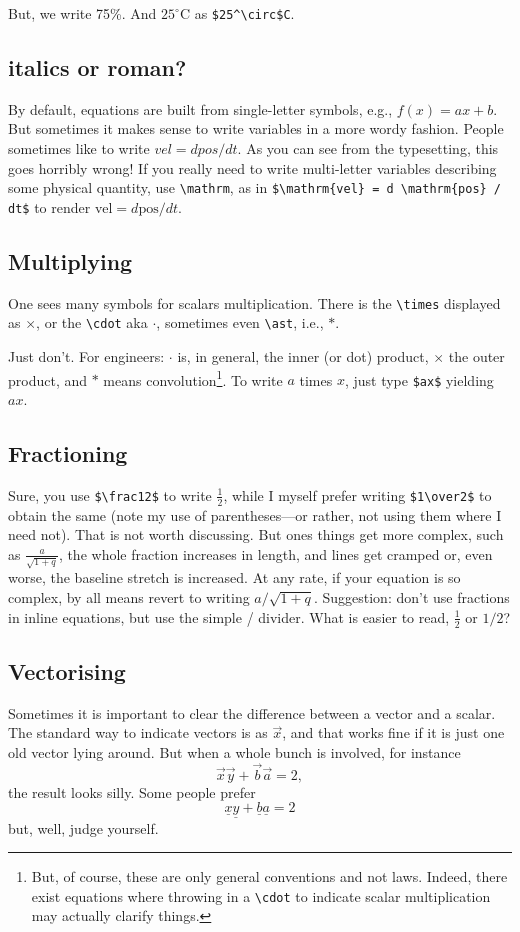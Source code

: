 \documentclass{article}
\begin{document}
But, we write 75\%. And $25^\circ$C as \verb+$25^\circ$C+.


\subsection{italics or roman?}
By default, equations are built from single-letter symbols, e.g., $f(x) = ax+b$.  But sometimes it makes
sense to write variables in a more wordy fashion.  People sometimes like to write $vel = d pos / d t$.  As
you can see from the typesetting, this goes horribly wrong!  If you really need to write multi-letter
variables describing some physical quantity, use \verb+\mathrm+, as in
\verb+$\mathrm{vel} = d \mathrm{pos} / dt$+ to render $\mathrm{vel} = d \mathrm{pos} / dt$.

\subsection{Multiplying}
One sees many symbols for scalars multiplication.  There is the \verb+\times+ displayed as $\times$,
or the \verb+\cdot+ aka $\cdot$, sometimes even \verb+\ast+, i.e., $\ast$.

Just don't.  For engineers: $\cdot$ is, in general, the inner (or dot) product, $\times$ the 
outer product, and $\ast$ means convolution\footnote{But, of course, these are only
general conventions and not laws.  Indeed, there exist equations where throwing in
a \verb+\cdot+ to indicate scalar multiplication may actually clarify things.}. To write
$a$ times $x$, just type \verb+$ax$+ yielding $ax$.


\subsection{Fractioning}
Sure, you use \verb+$\frac12$+ to write $\frac12$, while I myself prefer writing \verb+$1\over2$+ to obtain
the same (note my use of parentheses---or rather, not using them where I need not).
That is not worth discussing.  But ones things get more complex, such as $\frac a{\sqrt{1+q}}$, the whole
fraction increases in length, and lines get cramped or, even worse, the baseline stretch is increased.
At any rate, if your equation is so complex, by all means revert to writing $a/{\sqrt{1+q}}$.   Suggestion:
don't use fractions in inline equations, but use the simple / divider.  What is easier
to read, $\frac12$ or $1/2$?

\subsection{Vectorising}
Sometimes it is important to clear the difference between a vector and a scalar.
The standard way to indicate vectors is as $\vec x$, and that works fine if it is 
just one old vector lying around.  But when a whole bunch is involved, for instance
$$ \vec x \vec y + \vec b \vec a = 2,$$ the result looks silly.  Some people
prefer $$ \underline x \underline y + \underline b \underline a = 2$$ but, well,
judge yourself.  
\end{document}
